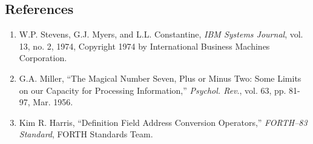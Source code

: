 \subsection{References}
	
\begin{enumerate}
\item W.P. Stevens, G.J. Myers, and L.L. Constantine, \emph{ IBM Systems Journal}, vol. 13, no. 2, 1974, Copyright 1974 by International Business Machines Corporation.
\item G.A. Miller, ``The Magical Number Seven, Plus or Minus Two: Some Limits on our Capacity for Processing Information,'' \emph{Psychol. Rev}., vol. 63, pp. 81-97, Mar. 1956.
\item Kim R. Harris, ``Definition Field Address Conversion Operators,'' \emph{FORTH--83 Standard}, FORTH Standards Team.
\end{enumerate}


